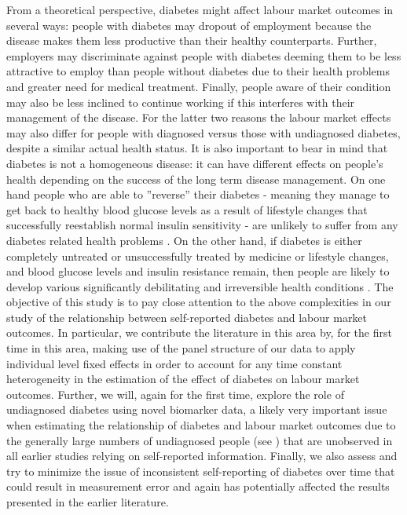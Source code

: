 From a theoretical perspective, diabetes might affect labour market outcomes
in several ways:
people with diabetes may dropout
of employment because the disease makes them less productive than
their healthy counterparts. Further, employers may discriminate against
people with diabetes deeming them to be less attractive to employ
than people without diabetes due to their health problems and greater
need for medical treatment. Finally, people aware of their condition
may also be less inclined to continue working if this interferes with
their management of the disease. For the latter two reasons the labour
market effects may also differ for people with diagnosed versus those
with undiagnosed diabetes, despite a similar actual health status.
It is also important to bear in mind that diabetes is not a homogeneous
disease: it can have different effects on people's health depending
on the success of the long term disease management. On one hand people
who are able to ''reverse'' their diabetes - meaning they manage
to get back to healthy blood glucose levels as a result of lifestyle
changes that successfully reestablish normal insulin sensitivity -
are unlikely to suffer from any diabetes related health problems \citep{Lim2011,Gregg2012}.
On the other hand, if diabetes is either completely untreated or unsuccessfully
treated by medicine or lifestyle changes, and blood glucose levels
and insulin resistance remain, then people are likely to develop various
significantly debilitating and irreversible health conditions \citep{Reynoso-Noveron2011}.
The objective of this study is to pay close attention to the above
complexities in our study of the relationship between
self-reported diabetes and labour market outcomes. In particular,
we contribute the literature in this area by, for the first time in this area, making use of the panel structure of our data to apply individual level fixed effects in order to account for any time constant heterogeneity in the estimation of the effect of diabetes on labour market outcomes. Further, we will, again for the first time, explore the role of undiagnosed diabetes using novel biomarker data, a likely very important issue when estimating the relationship of diabetes and labour market outcomes due to the generally large numbers of undiagnosed people (see \citet{Beagley2014}) that are unobserved in all earlier studies relying on self-reported information. Finally, we also assess and try to minimize the issue of inconsistent self-reporting of diabetes over time that could result in measurement error and again has potentially affected the results presented in the earlier literature.

